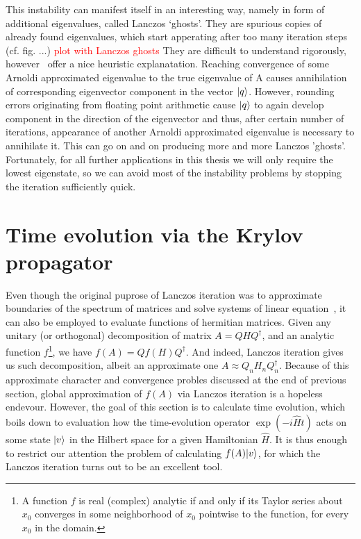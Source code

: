 This instability can manifest itself in an interesting way, namely in form of additional eigenvalues, called Lanczos `ghosts'.
They are spurious copies of already found eigenvalues, which start apperating after too many iteration steps (cf. fig. ...)
\textcolor{red}{plot with Lanczos ghosts}
They are difficult to understand rigorously, however~\textcite{Trefethen1997} offer a nice heuristic explanatation.
Reaching convergence of some Arnoldi approximated eigenvalue to the true eigenvalue of A causes annihilation
of corresponding eigenvector component in the vector \(\ket{q}\). However, rounding errors originating from
floating point arithmetic cause \(\ket{q}\) to again develop component in the direction of the eigenvector
and thus, after certain number of iterations, appearance of another Arnoldi approximated eigenvalue is necessary
to annihilate it. This can go on and on producing more and more Lanczos 'ghosts'.
Fortunately, for all further applications in this thesis we will only require the lowest eigenstate, so we can
avoid most of the instability problems by stopping the iteration sufficiently quick.

\section{Time evolution via the Krylov propagator}

Even though the original puprose of Lanczos iteration was to approximate boundaries of the spectrum of matrices and
solve systems of linear equation~\autocite{Simoncini2016,Shewchuk1994a}, it can also be employed to evaluate functions
of hermitian matrices. Given any unitary (or orthogonal) decomposition of matrix \(A = QHQ^{\dagger}\), and an analytic
function \(f\)\footnote{A function \(f\) is real (complex) analytic if and only if its Taylor series about \(x_0\) 
converges in some neighborhood of \(x_0\) pointwise to the function, for every \(x_0\) in the domain.}, we have
\(f(A) = Qf(H)Q^{\dagger}\). And indeed, Lanczos iteration gives us such decomposition, albeit an approximate one
\(A \approx Q_n H_n Q_n^{\dagger}\). Because of this approximate character and convergence probles discussed at
the end of previous section, global approximation of \(f(A)\) via Lanczos iteration is a hopeless endevour.
However, the goal of this section is to calculate time evolution, which boils down to evaluation how the time-evolution
operator \(\exp\left(-i \hat{H} t\right) \) acts on some state \(\ket{v}\) in the Hilbert space for a given
Hamiltonian \(\hat{H}\). It is thus enough to restrict our attention the problem of calculating \(f(A){\ket{v}}\), for
which the Lanczos iteration turns out to be an excellent tool.

